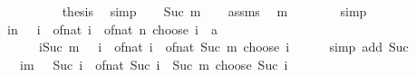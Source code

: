\begin{isabellebody}
\ \ \isamarkupfalse%
\ {}\isanewline
\ \ \isamarkupfalse%
\ \isamarkupfalse%
\ {\isacharquery}{\kern0pt}thesis\ \isamarkupfalse%
\ simp\isanewline
{}\isamarkupfalse%
\isanewline
\ \ \isamarkupfalse%
\ {\isacharparenleft}{\kern0pt}Suc\ m{\isacharparenright}{\kern0pt}\isanewline
\ \ \isamarkupfalse%
\ assms\ \isamarkupfalse%
\ {\isachardoublequoteopen}m\ {\isachargreater}{\kern0pt}\ {}{\isachardoublequoteclose}\isanewline
\ \ \ \ \isamarkupfalse%
\ simp\isanewline
\ \ \isamarkupfalse%
\ {\isachardoublequoteopen}{\isacharparenleft}{\kern0pt}{\isasymSum}i{\isasymle}n{\isachardot}{\kern0pt}\ {\isacharparenleft}{\kern0pt}{\isacharminus}{\kern0pt}{}{\isacharparenright}{\kern0pt}\ {\isacharcircum}{\kern0pt}\ i\ {\isacharasterisk}{\kern0pt}\ of{\isacharunderscore}{\kern0pt}nat\ i\ {\isacharasterisk}{\kern0pt}\ of{\isacharunderscore}{\kern0pt}nat\ {\isacharparenleft}{\kern0pt}n\ choose\ i{\isacharparenright}{\kern0pt}\ {\isacharcolon}{\kern0pt}{\isacharcolon}{\kern0pt}\ {\isacharprime}{\kern0pt}a{\isacharparenright}{\kern0pt}\ {\isacharequal}{\kern0pt}\isanewline
\ \ \ \ \ \ {\isacharparenleft}{\kern0pt}{\isasymSum}i{\isasymle}Suc\ m{\isachardot}{\kern0pt}\ {\isacharparenleft}{\kern0pt}{\isacharminus}{\kern0pt}{}{\isacharparenright}{\kern0pt}\ {\isacharcircum}{\kern0pt}\ i\ {\isacharasterisk}{\kern0pt}\ of{\isacharunderscore}{\kern0pt}nat\ i\ {\isacharasterisk}{\kern0pt}\ of{\isacharunderscore}{\kern0pt}nat\ {\isacharparenleft}{\kern0pt}Suc\ m\ choose\ i{\isacharparenright}{\kern0pt}{\isacharparenright}{\kern0pt}{\isachardoublequoteclose}\isanewline
\ \ \ \ \isamarkupfalse%
\ {\isacharparenleft}{\kern0pt}simp\ add{\isacharcolon}{\kern0pt}\ Suc{\isacharparenright}{\kern0pt}\isanewline
\ \ \isamarkupfalse%
\ \isamarkupfalse%
\ {\isachardoublequoteopen}{\isasymdots}\ {\isacharequal}{\kern0pt}\ {\isacharparenleft}{\kern0pt}{\isasymSum}i{\isasymle}m{\isachardot}{\kern0pt}\ {\isacharparenleft}{\kern0pt}{\isacharminus}{\kern0pt}{}{\isacharparenright}{\kern0pt}\ {\isacharcircum}{\kern0pt}\ {\isacharparenleft}{\kern0pt}Suc\ i{\isacharparenright}{\kern0pt}\ {\isacharasterisk}{\kern0pt}\ of{\isacharunderscore}{\kern0pt}nat\ {\isacharparenleft}{\kern0pt}Suc\ i\ {\isacharasterisk}{\kern0pt}\ {\isacharparenleft}{\kern0pt}Suc\ m\ choose\ Suc\ i{\isacharparenright}{\kern0pt}{\isacharparenright}{\kern0pt}{\isacharparenright}{\kern0pt}{\isachardoublequoteclose}\isanewline

\end{isabellebody}
